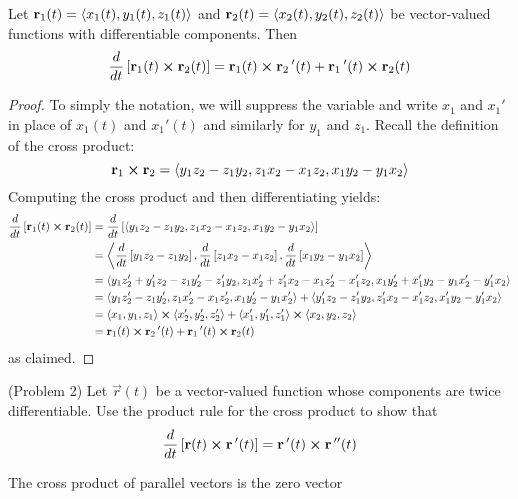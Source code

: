 \documentclass[handout]{ximera}
\begin{document}
\begin{proposition}
Let $\mathbf r_1(t) = \left\langle x_1(t), y_1(t),z_1(t)\right\rangle$ and $\mathbf r_2(t) = \left\langle x_2(t), y_2(t),z_2(t)\right\rangle$ be vector-valued functions with differentiable components.
Then
\[
\frac{d}{dt}\left[\mathbf r_1(t) \boldsymbol\times \mathbf r_2(t)\right] = \mathbf r_1(t) \boldsymbol\times \mathbf r_2\,'(t) + \mathbf r_1\,'(t) \boldsymbol\times \mathbf r_2(t)
\]
\end{proposition}
\begin{proof}
To simply the notation, we will suppress the variable and write $x_1$ and $x_1'$ in place of $x_1(t)$ and $x_1'(t)$ and similarly for $y_1$ and $z_1$.
Recall the definition of the cross product:
\[
\mathbf{r}_1 \boldsymbol\times \mathbf{r}_2 =  \left\langle y_1z_2 - z_1y_2, z_1x_2 - x_1z_2, x_1y_2 - y_1x_2\right\rangle
\]
Computing the cross product and then differentiating yields:
\begin{align*}
\frac{d}{dt}\left[\mathbf r_1(t) \boldsymbol\times \mathbf r_2(t)\right] &= \frac{d}{dt} \left[ \left\langle y_1z_2 - z_1y_2, z_1x_2 - x_1z_2, x_1y_2 - y_1x_2\right\rangle\right]\\
&=  \left\langle \frac{d}{dt} \left[y_1z_2 - z_1y_2\right], \frac{d}{dt} \left[z_1x_2 - x_1z_2\right],\frac{d}{dt} \left[x_1y_2 - y_1x_2\right]\right\rangle\\
&= \left\langle y_1z_2' + y_1'z_2- z_1y_2'  - z_1'y_2,  z_1x_2' + z_1'x_2- x_1z_2'  - x_1'z_2, x_1y_2' +x_1'y_2- y_1x_2'  - y_1'x_2      \right\rangle\\
&=\left\langle y_1z_2' - z_1y_2'  ,  z_1x_2' - x_1z_2', x_1y_2' - y_1x_2'\right\rangle+ \left\langle  y_1'z_2  - z_1'y_2, z_1'x_2 - x_1'z_2, x_1'y_2 - y_1'x_2\right\rangle\\
&= \left\langle x_1, y_1, z_1\right\rangle\boldsymbol\times \left\langle x_2', y_2', z_2'\right\rangle + \left\langle x_1', y_1', z_1'\right\rangle\boldsymbol\times \left\langle x_2, y_2, z_2\right\rangle\\
&= \mathbf r_1(t) \boldsymbol\times \mathbf r_2\,'(t) + \mathbf r_1\,'(t) \boldsymbol\times \mathbf r_2(t)
\end{align*}
as claimed.


\end{proof}

\begin{problem}(Problem 2)
Let $\vec r(t)$ be a vector-valued function whose components are twice differentiable. Use the product rule for the cross product to show that
\[
\frac{d}{dt}\left[\mathbf r(t) \boldsymbol\times \mathbf r\,'(t) \right] = \mathbf r\,'(t) \boldsymbol\times \mathbf r\,''(t)
\]
\begin{hint}
The cross product of parallel vectors is the zero vector
\end{hint}
\end{problem}
\end{document}

